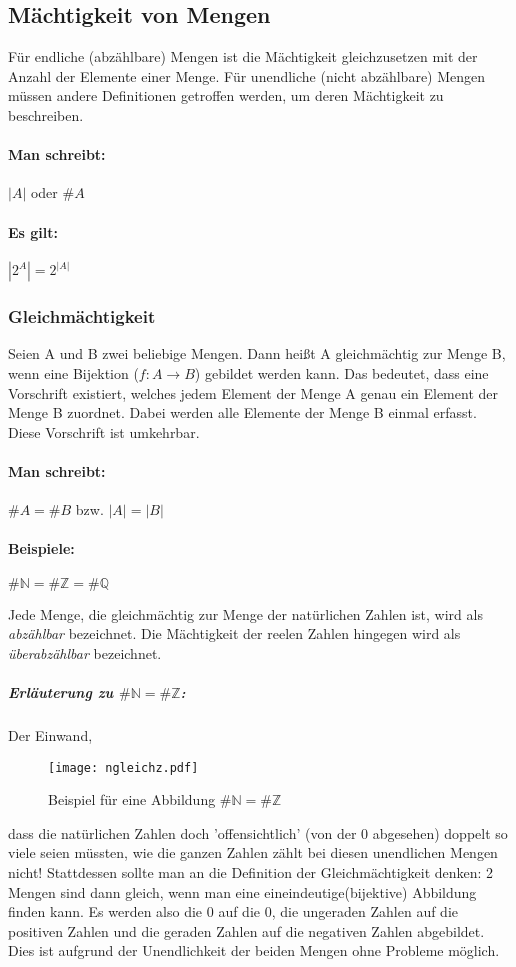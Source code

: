 \subsection{Mächtigkeit von Mengen}
Für endliche (abzählbare) Mengen ist die Mächtigkeit gleichzusetzen mit der Anzahl
der Elemente einer Menge. Für unendliche (nicht abzählbare) Mengen müssen andere
Definitionen getroffen werden, um deren Mächtigkeit zu beschreiben.
\paragraph{Man schreibt:}
\({}|{}A{}|{}\) oder \(\#A\)
\paragraph{Es gilt:}
\begin{math}
{}|{}2^A{}|{} = 2^{{}|{}A{}|{}}
\end{math}
\subsubsection*{Gleichmächtigkeit}
Seien A und B zwei beliebige Mengen.
Dann heißt A gleichmächtig zur Menge B, wenn eine Bijektion (\({f:A}\rightarrow{B}\)) gebildet
werden kann. Das bedeutet, dass eine Vorschrift existiert, welches
jedem Element der Menge A genau ein Element der Menge B zuordnet.
Dabei werden alle Elemente der Menge B einmal erfasst. Diese
Vorschrift ist umkehrbar.
\paragraph{Man schreibt:} \(\#A = \#B\) bzw. \(|A| = |B|\)
\paragraph*{Beispiele:}
\begin{math}
\#{\mathbb N} = \#{\mathbb Z} = \#{\mathbb Q}
\end{math}

Jede Menge, die gleichmächtig zur Menge der natürlichen Zahlen ist, wird als \emph{abzählbar} bezeichnet.
Die Mächtigkeit der reelen Zahlen hingegen wird als \emph{überabzählbar} bezeichnet.
\subparagraph{Erläuterung zu \(\#{\mathbb N} = \#{\mathbb Z}\):} 

Der Einwand,\begin{figure}[b]
  \centering
  \caption{Beispiel für eine Abbildung \(\#{\mathbb N} = \#{\mathbb Z}\)}
  \texttt{[image: ngleichz.pdf]}
\end{figure} dass die natürlichen Zahlen doch 'offensichtlich' (von der 0
abgesehen) doppelt so viele seien müssten, wie die ganzen Zahlen zählt
bei diesen unendlichen Mengen nicht! Stattdessen sollte man an die
Definition der Gleichmächtigkeit denken: 2 Mengen sind dann gleich,
wenn man eine eineindeutige(bijektive) Abbildung finden kann.
Es werden also die 0 auf die 0, die ungeraden Zahlen auf die positiven
Zahlen und die geraden Zahlen auf die negativen Zahlen abgebildet.
Dies ist aufgrund der Unendlichkeit der beiden Mengen ohne Probleme
möglich.

